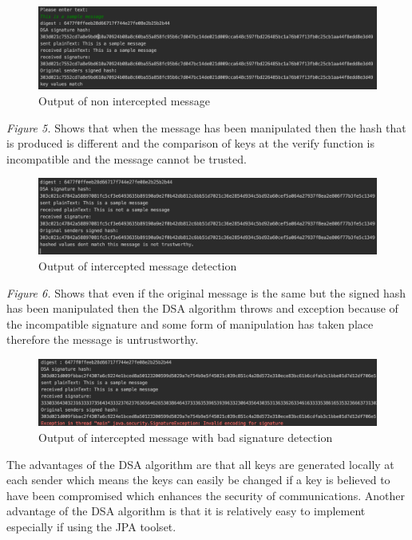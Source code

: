 \documentclass[a4paper, twoside, 11pt]{article}
\begin{document}
\begin{figure}[H]
	\centering
	\includegraphics[scale=0.5]{Images/successDSAMessage.png}
  \caption{Output of non intercepted message}
\end{figure}

\textit{Figure 5.} Shows that when the message has been manipulated then the hash that is produced is different and the comparison of keys at the verify function is incompatible and the message cannot be trusted. \\

\begin{figure}[H]
	\centering
	\includegraphics[scale=0.5]{Images/interceptedDSAMessage.png}
  \caption{Output of intercepted message detection}
\end{figure}

\textit{Figure 6.} Shows that even if the original message is the same but the signed hash has been manipulated then the DSA algorithm throws and exception because of the incompatible signature and some form of manipulation has taken place therefore the message is untrustworthy. \\

\begin{figure}[H]
	\centering
	\includegraphics[scale=0.5]{Images/interceptedKeyMessage.png}
  \caption{Output of intercepted message with bad signature detection}
\end{figure}

The advantages of the DSA algorithm are that all keys are generated locally at each sender which means the keys can easily be changed if a key is believed to have been compromised which enhances the security of communications. Another advantage of the DSA algorithm is that it is relatively easy to implement especially if using the JPA toolset.
\end{document}
